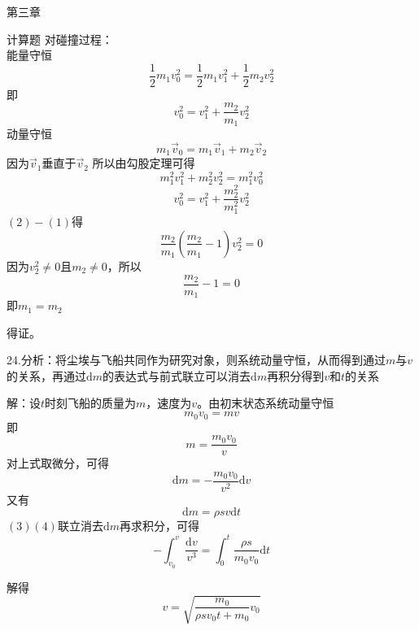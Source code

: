 \documentclass[a4paper,fleqn,twocolumn]{ctexart}
\newcommand{\di}[1]{\mathrm{d}#1}
\begin{document}
\begin{section}{第三章}
\begin{subsection}{计算题}
对碰撞过程：\\能量守恒
\begin{equation*}
\frac{1}{2}m_1v_0^2=\frac{1}{2}m_1v_1^2+\frac{1}{2}m_2v_2^2
\end{equation*}
即
\begin{equation}
v_0^2=v_1^2+\frac{m_2}{m_1}v_2^2
\end{equation}
动量守恒
\begin{equation*}
m_1\vec{v}_0=m_1\vec{v}_1+m_2\vec{v}_2
\end{equation*}
因为$\vec{v}_1$垂直于$\vec{v}_2$
所以由勾股定理可得
\begin{equation*}
m_1^2 v_1^2 + m_2^2 v_2^2 = m_1^2 v_0^2
\end{equation*}
\begin{equation}
v_0^2=v_1^2+\frac{m_2^2}{m_1^2}v_2^2
\end{equation}
$(2)-(1)$得
\begin{equation*}
\frac{m_2}{m_1}(\frac{m_2}{m_1}-1)v_2^2=0
\end{equation*}
因为$v_2^2 \ne 0$且$m_2 \ne 0$，所以
\begin{equation*}
\frac{m_2}{m_1}-1=0
\end{equation*}
即$m_1=m_2$

得证。

24.分析：将尘埃与飞船共同作为研究对象，则系统动量守恒，从而得到通过$m$与$v$的关系，再通过$\di m$的表达式与前式联立可以消去$\di m$再积分得到$v$和$t$的关系

解：设$t$时刻飞船的质量为$m$，速度为$v$。由初末状态系统动量守恒
\begin{equation*}
m_0 v_0=mv
\end{equation*}
即
\begin{equation*}
m=\frac{m_0 v_0}{v}
\end{equation*}
对上式取微分，可得
\begin{equation}
\di m=- \frac{m_0 v_0}{v^2} \di v
\end{equation}
又有
\begin{equation}
\di m=\rho sv\di t
\end{equation}
$(3)(4)$联立消去$\di m$再求积分，可得
\begin{equation*}
-\int_{v_0}^v \frac{\di v}{v^3}=\int_0^t \frac{\rho s}{m_0 v_0} \di t
\end{equation*}

解得
\begin{equation*}
v=\sqrt{\frac{m_0}{\rho sv_0 t+m_0}v_0}
\end{equation*}
\end{subsection}
\end{section}
\end{document}
